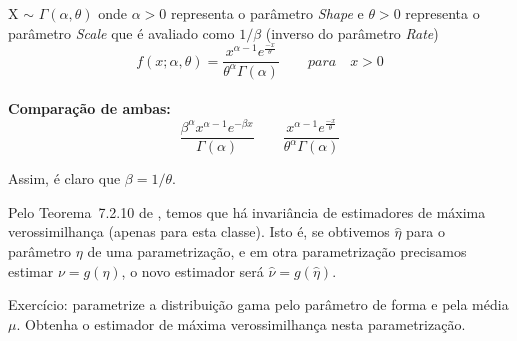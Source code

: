 X $\sim$ \begin{math} \Gamma(\alpha, \theta) \end{math} onde \begin{math} \alpha > 0 \end{math} representa o parâmetro \textit{Shape} e \begin{math} \theta > 0 \end{math} representa o parâmetro \textit{Scale} que é avaliado como \begin{math} 1/ \beta \end{math} (inverso do parâmetro \textit{Rate})
\begin{equation}
f(x; \alpha, \theta )=\frac{x^{\alpha-1}e^{\frac{-x}{\theta}}}{\theta^{\alpha}\Gamma(\alpha)} \qquad para \quad x > 0
\end{equation}\\

\textbf{Comparação de ambas:}\\

\begin{equation}
\frac{\beta^{\alpha}x^{\alpha-1}e^{-\beta x}}{\Gamma(\alpha)} \qquad \frac{x^{\alpha-1}e^{\frac{-x}{\theta}}}{\theta^{\alpha}\Gamma(\alpha)}
\end{equation}

Assim, é claro que $\beta = 1/\theta$.

Pelo Teorema~7.2.10 de \citet{CasellaBergerStatisticalInference}, temos que há invariância de estimadores de máxima verossimilhança (apenas para esta classe).
Isto é, se obtivemos $\widehat{\eta}$ para o parâmetro $\eta$ de uma parametrização, e em otra parametrização precisamos estimar $\nu=g(\eta)$, o novo estimador será $\widehat{\nu}=g(\widehat{\eta})$.

Exercício: parametrize a distribuição gama pelo parâmetro de forma e pela média $\mu$.
Obtenha o estimador de máxima verossimilhança nesta parametrização.




